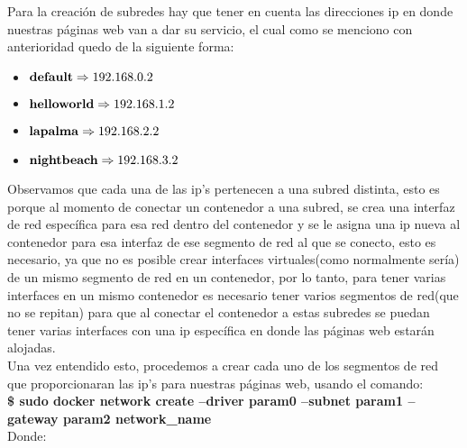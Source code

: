 \documentclass[10pt,letterpaper]{article}
\begin{document}
\begin{enumerate}
Para la creaci\'on de subredes hay que tener en cuenta las direcciones ip en donde nuestras p\'aginas web van a dar su servicio, el cual como se menciono con anterioridad quedo de la siguiente forma:


\begin{itemize}
\item $\hbox{\textbf{default}} \Rightarrow \hbox{192.168.0.2}$
\item $\hbox{\textbf{helloworld}} \Rightarrow \hbox{192.168.1.2}$
\item $\hbox{\textbf{lapalma}} \Rightarrow \hbox{192.168.2.2}$
\item $\hbox{\textbf{nightbeach}} \Rightarrow \hbox{192.168.3.2}$
\end{itemize}

Observamos que cada una de las ip's pertenecen a una subred distinta, esto es porque al momento de conectar un contenedor a una subred, se crea una interfaz de red espec\'ifica para esa red dentro del contenedor y se le asigna una ip nueva al contenedor para esa interfaz de ese segmento de red al que se conecto, esto es necesario, ya que no es posible crear interfaces virtuales(como normalmente ser\'ia) de un mismo segmento de red en un contenedor, por lo tanto, para tener varias interfaces en un mismo contenedor es necesario tener varios segmentos de red(que no se repitan) para que al conectar el contenedor a estas subredes se puedan tener varias interfaces con una ip espec\'ifica en donde las p\'aginas web estar\'an alojadas.\\

Una vez entendido esto, procedemos a crear cada uno de los segmentos de red que proporcionaran las ip's para nuestras p\'aginas web, usando el comando:\\

\textbf{\$ sudo docker network create --driver param0 --subnet param1 --gateway param2 network\_name}\\

Donde:


\end{enumerate}
\end{document}
